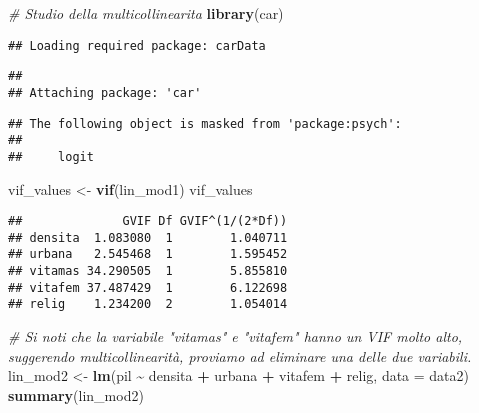 \documentclass[
]{article}
\newenvironment{Shaded}{\begin{snugshade}}{\end{snugshade}}
\newcommand{\AttributeTok}[1]{\textcolor[rgb]{0.13,0.29,0.53}{#1}}
\newcommand{\CommentTok}[1]{\textcolor[rgb]{0.56,0.35,0.01}{\textit{#1}}}
\newcommand{\FunctionTok}[1]{\textcolor[rgb]{0.13,0.29,0.53}{\textbf{#1}}}
\newcommand{\NormalTok}[1]{#1}
\newcommand{\OtherTok}[1]{\textcolor[rgb]{0.56,0.35,0.01}{#1}}
\newcommand{\SpecialCharTok}[1]{\textcolor[rgb]{0.81,0.36,0.00}{\textbf{#1}}}
\begin{document}
\begin{Shaded}
\begin{Highlighting}[]
\CommentTok{\# Studio della multicollinearita\textquotesingle{}}
\FunctionTok{library}\NormalTok{(car)}
\end{Highlighting}
\end{Shaded}

\begin{verbatim}
## Loading required package: carData
\end{verbatim}

\begin{verbatim}
## 
## Attaching package: 'car'
\end{verbatim}

\begin{verbatim}
## The following object is masked from 'package:psych':
## 
##     logit
\end{verbatim}

\begin{Shaded}
\begin{Highlighting}[]
\NormalTok{vif\_values }\OtherTok{\textless{}{-}} \FunctionTok{vif}\NormalTok{(lin\_mod1)}
\NormalTok{vif\_values}
\end{Highlighting}
\end{Shaded}

\begin{verbatim}
##              GVIF Df GVIF^(1/(2*Df))
## densita  1.083080  1        1.040711
## urbana   2.545468  1        1.595452
## vitamas 34.290505  1        5.855810
## vitafem 37.487429  1        6.122698
## relig    1.234200  2        1.054014
\end{verbatim}

\begin{Shaded}
\begin{Highlighting}[]
\CommentTok{\# Si noti che la variabile "vitamas" e "vitafem" hanno un VIF molto alto, suggerendo multicollinearità, proviamo ad eliminare una delle due variabili.}
\NormalTok{lin\_mod2 }\OtherTok{\textless{}{-}} \FunctionTok{lm}\NormalTok{(pil }\SpecialCharTok{\textasciitilde{}}\NormalTok{ densita }\SpecialCharTok{+}\NormalTok{ urbana }\SpecialCharTok{+}\NormalTok{ vitafem }\SpecialCharTok{+}\NormalTok{ relig, }\AttributeTok{data =}\NormalTok{ data2)}
\FunctionTok{summary}\NormalTok{(lin\_mod2)}
\end{Highlighting}
\end{Shaded}
\end{document}
